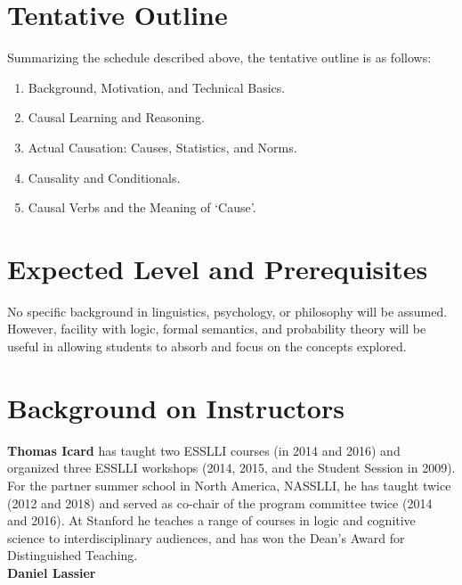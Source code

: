 \documentclass[english]{article}
\begin{document}

\section*{\large{Tentative Outline}}

Summarizing the schedule described above, the tentative outline is as follows:

\normalsize{
\begin{enumerate}
  \item Background, Motivation, and Technical Basics.
  \item Causal Learning and Reasoning.
  \item Actual Causation: Causes, Statistics, and Norms.
  \item Causality and Conditionals.
  \item Causal Verbs and the Meaning of `Cause'.
\end{enumerate}
}

\section*{\large{Expected Level and Prerequisites}}
No specific background in linguistics, psychology, or philosophy will be assumed. However, facility with logic, formal semantics, and probability theory will be useful in allowing students to absorb and focus on the concepts explored. 


\section*{\large{Background on Instructors}}

\textbf{Thomas Icard} has taught two ESSLLI courses (in 2014 and 2016) and organized three ESSLLI workshops (2014, 2015, and the Student Session in 2009). For the partner summer school in North America, NASSLLI, he has taught twice (2012 and 2018) and served as co-chair of the program committee twice (2014 and 2016). At Stanford he teaches a range of courses in logic and cognitive science to interdisciplinary audiences, and has won the Dean's Award for Distinguished Teaching. \\

\noindent \textbf{Daniel Lassier} 



 
\end{document}

